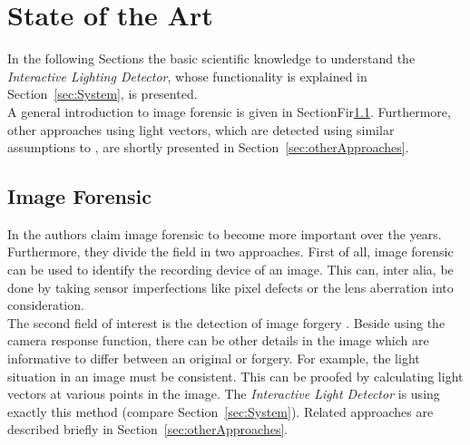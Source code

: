 \section{State of the Art} \label{sec:StateOfTheArt}
In the following Sections the basic scientific knowledge to understand the \textit{Interactive Lighting Detector}, whose functionality is explained in Section~\ref{sec:System}, is presented.\\
A general introduction to image forensic is given in SectionFir\ref{sec:imageForensic}.
Furthermore, other approaches using light vectors, which are detected using similar assumptions to \cite{Johnson}, are shortly presented in Section~\ref{sec:otherApproaches}.


\subsection{Image Forensic}\label{sec:imageForensic}

In \cite{4284575} the authors claim image forensic to become more important over the years. Furthermore, they divide the field in two approaches. First of all, image forensic can be used to identify the recording device of an image. This can, inter alia, be done by taking sensor imperfections like pixel defects or the lens aberration into consideration. \\
The second field of interest is the detection of image forgery \cite{4806202}. Beside using the camera response function, there can be other details in the image which are informative to differ between an original or forgery. For example, the light situation in an image must be consistent. This can be proofed by calculating light vectors at various points in the image. The \textit{Interactive Light Detector} is using exactly this method (compare Section~\ref{sec:System}). Related approaches are described briefly in Section~\ref{sec:otherApproaches}.


